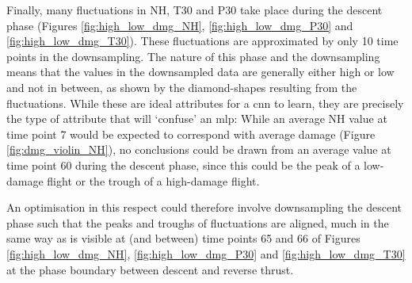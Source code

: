 Finally, many fluctuations in NH, T30 and P30 take place during the descent phase (Figures \ref{fig:high_low_dmg_NH}, \ref{fig:high_low_dmg_P30} and \ref{fig:high_low_dmg_T30}). These fluctuations are approximated by only 10 time points in the downsampling. The nature of this phase and the downsampling means that the values in the downsampled data are generally either high or low and not in between, as shown by the diamond-shapes resulting from the fluctuations. While these are ideal attributes for a \ac{cnn} to learn, they are precisely the type of attribute that will `confuse' an \ac{mlp}: While an average NH value at time point 7 would be expected to correspond with average damage (Figure \ref{fig:dmg_violin_NH}), no conclusions could be drawn from an average value at time point 60 during the descent phase, since this could be the peak of a low-damage flight or the trough of a high-damage flight.

An optimisation in this respect could therefore involve downsampling the descent phase such that the peaks and troughs of fluctuations are aligned, much in the same way as is visible at (and between) time points 65 and 66 of Figures \ref{fig:high_low_dmg_NH}, \ref{fig:high_low_dmg_P30} and \ref{fig:high_low_dmg_T30} at the phase boundary between descent and reverse thrust.
